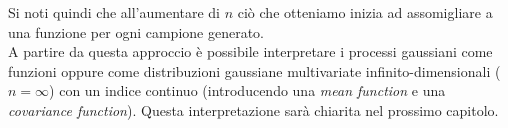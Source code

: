 Si noti quindi che all'aumentare di $n$ ciò che otteniamo inizia ad assomigliare a una funzione per ogni campione generato.\\
A partire da questa approccio è possibile interpretare i processi gaussiani come funzioni oppure come distribuzioni gaussiane multivariate infinito-dimensionali ($n=\infty$) con un indice continuo (introducendo una \textit{mean function} e una \textit{covariance function}). Questa interpretazione sarà chiarita nel prossimo capitolo.